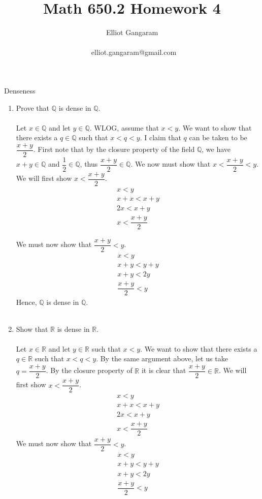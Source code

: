 \documentclass[12pt]{article}
\title{Math 650.2 Homework 4}
\author{Elliot Gangaram\\
\date{}
\ elliot.gangaram@gmail.com \\}
\begin{document}
\maketitle

\problem Denseness
\begin{enumerate}
\item Prove that $\mathbb{Q}$ is dense in $\mathbb{Q}$.  \\ \\
Let $x \in \mathbb{Q}$ and let $y \in \mathbb{Q}$. WLOG, assume that $x<y$. We want to show that there exists a $q \in \mathbb{Q}$ such that $x<q<y$. I claim that $q$ can be taken to be $\dfrac{x+y}{2}$. First note that by the closure property of the field $\mathbb{Q}$, we have $x+y \in \mathbb{Q}$ and $\dfrac{1}{2} \in \mathbb{Q}$, thus $\dfrac{x+y}{2} \in \mathbb{Q}$. We now must show that $x< \dfrac{x+y}{2}<y$. We will first show $x< \dfrac{x+y}{2}$. \begin{gather*}
      x<y \\
x+x < x+y  \\
2x < x + y \\
x < \dfrac{x+y}{2}
\end{gather*}

We must now show that  $\dfrac{x+y}{2}<y$.
\begin{gather*}
      x<y \\
x+y < y+y \\ 
x+y < 2y \\
\dfrac{x+y}{2} < y
\end{gather*}
Hence, $\mathbb{Q}$ is dense in $\mathbb{Q}$. \\ \\

\item Show that $\mathbb{R}$ is dense in $\mathbb{R}$. \\ \\

Let $x \in \mathbb{R}$ and let $y \in \mathbb{R}$ such that $x<y$. We want to show that there exists a $q \in \mathbb{R}$ such that $x<q<y$. By the same argument above, let us take $q=\dfrac{x+y}{2}$. By the closure property of $\mathbb{R}$ it is clear that $\dfrac{x+y}{2} \in \mathbb{R}$.  We will first show $x< \dfrac{x+y}{2}$. \begin{align*}
      x<y \\
x+x < x+y \\ 
2x < x + y \\
x < \dfrac{x+y}{2}
\end{align*}
We must now show that  $\dfrac{x+y}{2}<y$.
\begin{align*}
      x<y \\
x+y < y+y \\ 
x+y < 2y \\
\dfrac{x+y}{2} < y
\end{align*}
\\ \\



\end{enumerate}
\end{document}
